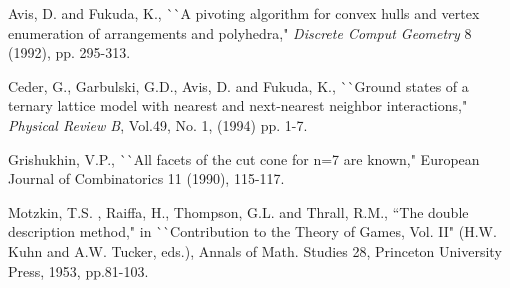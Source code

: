 \addtolength{\baselineskip}{-0.5\baselineskip}
\begin{thebibliography}{99}
 Avis, D.  and Fukuda, K., ^^ ^^ A pivoting algorithm
        for convex hulls and vertex enumeration of arrangements
        and polyhedra," {\em Discrete Comput Geometry} 8
        (1992), pp. 295-313.

 Ceder, G., Garbulski, G.D.,  Avis, D. and Fukuda, K., 
^^ ^^ Ground states of a ternary lattice model with nearest
and next-nearest neighbor interactions,"
{\em Physical Review B\/}, Vol.49, No. 1, (1994)  pp. 1-7.

 Grishukhin, V.P., ^^ ^^ All facets of
the cut cone for n=7 are known," European Journal of
Combinatorics 11 (1990), 115-117.

 Motzkin, T.S. , Raiffa, H.,  
Thompson, G.L. and  Thrall, R.M., ``The double description method," 
in  ^^ ^^ Contribution to the Theory of Games, Vol. II"
(H.W. Kuhn and A.W. Tucker, eds.),
Annals of Math. Studies 28,  Princeton University Press, 1953, pp.81-103.

\end{thebibliography}



